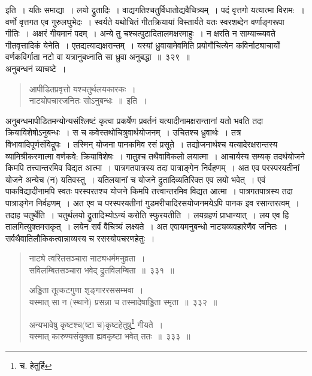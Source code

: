 \documentclass[11pt, openany]{book}
\begin{document}
\noindent
इति~। {\qtt यतिः} समाद्या~। {\qtt लयो} द्रुतादिः~। वाद्यगतिश्चतुर्विधातोद्यवैचित्र्यम्~। पदं वृत्तगो यत्यात्मा विराम:~। वर्णो वृत्तगत एव गुरुलघुभेदः~। स्वर्यते यथोचितं गीतक्रियायां विस्तार्यते यतः स्वरशब्देन वर्णाङ्गरूपा गीतिः~। अक्षरं गीयमानं पदम्~। अन्ये तु चश्चत्पुटादितालमक्षरमाहुः~। न क्षरति न साम्याच्च्यवते गीतवृत्तादिकं येनेति~। एतद्यत्याद्यक्षरान्तम्~। यस्यां ध्रुवायामेवमिति प्रयोगौचित्येन कविर्नाट्याचार्यो वर्णकविर्गाता नटो वा यत्रानुबध्नाति सा ध्रुवा अनुबद्धा~॥~३२९~॥\\

{\qtt अनुबन्धनं} व्याचष्टे~।

\begin{quote}
{\qt आपीडितप्रवृत्तो यश्चतुर्थलयकारकः~। \\
 नाट्योपचारजनितः सोऽनुबन्धः~॥}~इति~।
\end{quote}
 
अनुबन्धमापीडितमन्योन्यसंश्लिष्टं कृत्वा प्रकर्षेण प्रवर्तनं यत्यादीनामक्षरान्तानां यतो भवति तदा क्रियाविशेषोऽनुबन्धः~। स च कवेस्तथोचित्रुवार्थयोजनम्~। उचितश्च ध्रुवार्थः~। तत्र विभावादिपूर्णसंविद्रूपः~। तस्मिन् योजना पानकमिव रसं प्रसूते~। तद्योजनार्थश्च यत्यादेरक्षरान्तस्य व्यामिश्रीकरणात्मा वर्णकवे: क्रियाविशेषः~। गातुश्च तथैवाविकलो लयात्मा~। आचार्यस्य सम्यक् तदर्थयोजने किमपि तत्त्वान्तरमिव विद्यत आत्मा~। पात्रगतपात्रस्य तदा पात्राङ्गेन निर्वहणम्~। अत एव परस्परयतीनां योजने अन्येच (न) यतिवस्तु~। यतिलयानां च योजने द्रुतादिव्यतिरिक्त एव लयो भवेत्~। एवं पाकविद्यादीनामपि स्वतः परस्परतश्च योजने किमपि तत्त्वान्तरमिव विद्यत आत्मा~। पात्रगतपात्रस्य तदा पात्राङ्गेन निर्वहणम्~। अत एव च परस्परयतीनां गुडमरीचादिरसयोजनमयेऽपि पानक इव रसान्तरत्वम्~। तदाह चतुर्थेति~। चतुर्थलयो द्रुतादिभ्योऽन्यं करोति स्फुरयतीति~। लयग्रहणं प्राधान्यात्~। {\qtt लय एव हि} तालमित्युक्तमसकृत्~। लयेन सर्वं वैचित्र्यं लक्ष्यते~। अत एवायमनुबन्धो नाट्यव्यवहारेणैव जनितः~। सर्वथैवातिलौकिकत्वान्नाव्यस्य च रसस्योपचरणहेतुः~।

\newpage

\begin{quote}
{\na नाट्ये त्वरितसञ्चारा नाट्यधर्ममनुव्रता~। \\
 सविलम्बितसञ्चारा भवेद् द्रुतविलम्बिता~॥~३३१~॥

 अड्डिता तूत्कटगुणा शृङ्गाररससम्भवा~।\\
 यस्मात् सा न (स्थाने) प्रसन्ना च तस्मादेषाड्डिता स्मृता~॥~३३२~॥

 अन्यभावेषु कृष्टश्च(ष्टा च)कृष्टहेतुषु\renewcommand{\thefootnote}{1}\footnote{च. हेतुर्हि } गीयते~।\\
 यस्मात् कारुण्यसंयुक्ता ह्यवकृष्टा भवेत् ततः~॥~३३३~॥}
\end{quote}
\end{document}
